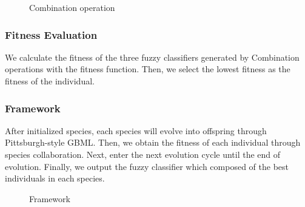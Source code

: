 \documentclass[conference,compsoc]{IEEEtran}
\begin{document}
\begin{figure}[htbp]%
	\centering
	\caption{Combination operation}
	\label{combine.png} 
\end{figure}
\subsubsection{Fitness Evaluation}
We calculate the fitness of the three fuzzy classifiers generated by Combination operations with the fitness function. Then, we select the lowest fitness as the fitness of the individual.

\subsubsection{Framework}
After initialized species, each species will evolve into offspring through Pittsburgh-style GBML. Then, we obtain the fitness of each individual through species collaboration. Next, enter the next evolution cycle until the end of evolution. Finally, we output the fuzzy classifier which composed of the best individuals in each species.
\begin{figure}[htbp]%
	\centering
	\caption{Framework}
	\label{selection.png} 
\end{figure}
\end{document}
